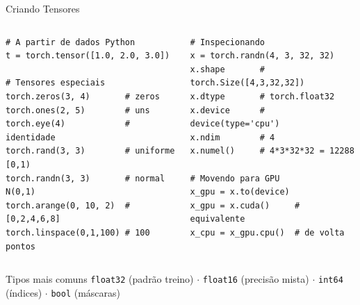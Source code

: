 \documentclass[aspectratio=169, 10pt]{beamer}
\begin{document}
\begin{frame}[fragile]{Criando Tensores}
\begin{columns}
\begin{lstlisting}
# A partir de dados Python
t = torch.tensor([1.0, 2.0, 3.0])

# Tensores especiais
torch.zeros(3, 4)       # zeros
torch.ones(2, 5)        # uns
torch.eye(4)            # identidade
torch.rand(3, 3)        # uniforme [0,1)
torch.randn(3, 3)       # normal N(0,1)
torch.arange(0, 10, 2)  # [0,2,4,6,8]
torch.linspace(0,1,100) # 100 pontos
\end{lstlisting}

\begin{lstlisting}
# Inspecionando
x = torch.randn(4, 3, 32, 32)
x.shape       # torch.Size([4,3,32,32])
x.dtype       # torch.float32
x.device      # device(type='cpu')
x.ndim        # 4
x.numel()     # 4*3*32*32 = 12288

# Movendo para GPU
x_gpu = x.to(device)
x_gpu = x.cuda()     # equivalente
x_cpu = x_gpu.cpu()  # de volta
\end{lstlisting}
\end{columns}

\begin{block}{Tipos mais comuns}
  \texttt{float32} (padrão treino) $\cdot$ \texttt{float16} (precisão mista) $\cdot$
  \texttt{int64} (índices) $\cdot$ \texttt{bool} (máscaras)
\end{block}
\end{frame}

\end{document}
